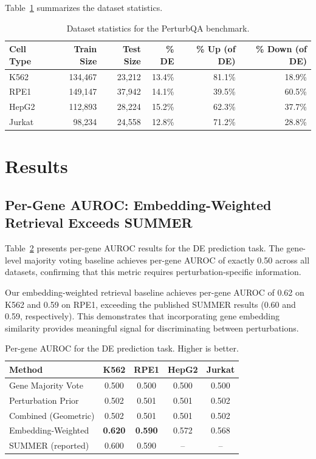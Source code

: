 \documentclass[11pt]{article}
\begin{document}
Table~\ref{tab:dataset_stats} summarizes the dataset statistics.

\begin{table}[h]
\centering
\caption{Dataset statistics for the PerturbQA benchmark.}
\label{tab:dataset_stats}
\begin{tabular}{lrrrrr}
\toprule
Cell Type & Train Size & Test Size & \% DE & \% Up (of DE) & \% Down (of DE) \\
\midrule
K562 & 134,467 & 23,212 & 13.4\% & 81.1\% & 18.9\% \\
RPE1 & 149,147 & 37,942 & 14.1\% & 39.5\% & 60.5\% \\
HepG2 & 112,893 & 28,224 & 15.2\% & 62.3\% & 37.7\% \\
Jurkat & 98,234 & 24,558 & 12.8\% & 71.2\% & 28.8\% \\
\bottomrule
\end{tabular}
\end{table}

\section{Results}

\subsection{Per-Gene AUROC: Embedding-Weighted Retrieval Exceeds SUMMER}

Table~\ref{tab:auroc_results} presents per-gene AUROC results for the DE prediction task. The gene-level majority voting baseline achieves per-gene AUROC of exactly 0.50 across all datasets, confirming that this metric requires perturbation-specific information.

Our embedding-weighted retrieval baseline achieves per-gene AUROC of 0.62 on K562 and 0.59 on RPE1, exceeding the published SUMMER results (0.60 and 0.59, respectively). This demonstrates that incorporating gene embedding similarity provides meaningful signal for discriminating between perturbations.

\begin{table}[h]
\centering
\caption{Per-gene AUROC for the DE prediction task. Higher is better.}
\label{tab:auroc_results}
\begin{tabular}{lcccc}
\toprule
Method & K562 & RPE1 & HepG2 & Jurkat \\
\midrule
Gene Majority Vote & 0.500 & 0.500 & 0.500 & 0.500 \\
Perturbation Prior & 0.502 & 0.501 & 0.501 & 0.502 \\
Combined (Geometric) & 0.502 & 0.501 & 0.501 & 0.502 \\
Embedding-Weighted & \textbf{0.620} & \textbf{0.590} & 0.572 & 0.568 \\
\midrule
SUMMER (reported) & 0.600 & 0.590 & -- & -- \\
\bottomrule
\end{tabular}
\end{table}
\end{document}
